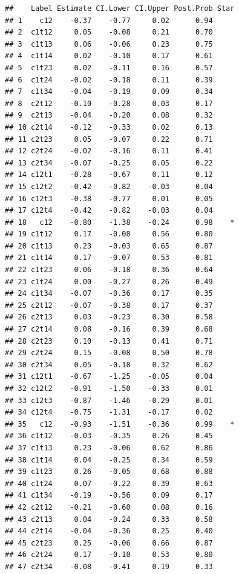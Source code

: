\documentclass[
]{article}
\begin{document}
\begin{verbatim}
##    Label Estimate CI.Lower CI.Upper Post.Prob Star
## 1    c12    -0.37    -0.77     0.02      0.94     
## 2  c1t12     0.05    -0.08     0.21      0.70     
## 3  c1t13     0.06    -0.06     0.23      0.75     
## 4  c1t14     0.02    -0.10     0.17      0.61     
## 5  c1t23     0.02    -0.11     0.16      0.57     
## 6  c1t24    -0.02    -0.18     0.11      0.39     
## 7  c1t34    -0.04    -0.19     0.09      0.34     
## 8  c2t12    -0.10    -0.28     0.03      0.17     
## 9  c2t13    -0.04    -0.20     0.08      0.32     
## 10 c2t14    -0.12    -0.33     0.02      0.13     
## 11 c2t23     0.05    -0.07     0.22      0.71     
## 12 c2t24    -0.02    -0.16     0.11      0.41     
## 13 c2t34    -0.07    -0.25     0.05      0.22     
## 14 c12t1    -0.28    -0.67     0.11      0.12     
## 15 c12t2    -0.42    -0.82    -0.03      0.04     
## 16 c12t3    -0.38    -0.77     0.01      0.05     
## 17 c12t4    -0.42    -0.82    -0.03      0.04     
## 18   c12    -0.80    -1.38    -0.24      0.98    *
## 19 c1t12     0.17    -0.08     0.56      0.80     
## 20 c1t13     0.23    -0.03     0.65      0.87     
## 21 c1t14     0.17    -0.07     0.53      0.81     
## 22 c1t23     0.06    -0.18     0.36      0.64     
## 23 c1t24     0.00    -0.27     0.26      0.49     
## 24 c1t34    -0.07    -0.36     0.17      0.35     
## 25 c2t12    -0.07    -0.38     0.17      0.37     
## 26 c2t13     0.03    -0.23     0.30      0.58     
## 27 c2t14     0.08    -0.16     0.39      0.68     
## 28 c2t23     0.10    -0.13     0.41      0.71     
## 29 c2t24     0.15    -0.08     0.50      0.78     
## 30 c2t34     0.05    -0.18     0.32      0.62     
## 31 c12t1    -0.67    -1.25    -0.05      0.04     
## 32 c12t2    -0.91    -1.50    -0.33      0.01     
## 33 c12t3    -0.87    -1.46    -0.29      0.01     
## 34 c12t4    -0.75    -1.31    -0.17      0.02     
## 35   c12    -0.93    -1.51    -0.36      0.99    *
## 36 c1t12    -0.03    -0.35     0.26      0.45     
## 37 c1t13     0.23    -0.06     0.62      0.86     
## 38 c1t14     0.04    -0.25     0.34      0.59     
## 39 c1t23     0.26    -0.05     0.68      0.88     
## 40 c1t24     0.07    -0.22     0.39      0.63     
## 41 c1t34    -0.19    -0.56     0.09      0.17     
## 42 c2t12    -0.21    -0.60     0.08      0.16     
## 43 c2t13     0.04    -0.24     0.33      0.58     
## 44 c2t14    -0.04    -0.36     0.25      0.40     
## 45 c2t23     0.25    -0.06     0.66      0.87     
## 46 c2t24     0.17    -0.10     0.53      0.80     
## 47 c2t34    -0.08    -0.41     0.19      0.33     

\end{verbatim}
\end{document}
